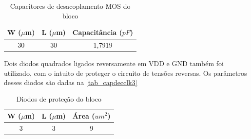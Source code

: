\begin{table}[htbp]
\caption{Capacitores de desacoplamento MOS do bloco \NomeBloco}
\label{tab_capdecclk2}
\centering
\begin{tabular}{ccc}
\toprule
W ($\mu$m)  & L ($\mu$m) & Capacit\^ancia ($pF$)\\
\midrule \midrule
30 & 30 & 1,7919\\
\bottomrule
\end{tabular}
\end{table}

Dois diodos quadrados ligados reversamente em VDD e GND tamb\'em foi utilizado, com o intuito de proteger o circuito de tens\~oes reversas. Os par\^ametros desses diodos s\~ao dadas na \autoref{tab_capdecclk3}

\begin{table}[htbp]
\caption{Diodos de prote{\c c}\~ao do bloco \NomeBloco}
\label{tab_capdecclk3}
\centering
\begin{tabular}{ccc}
\toprule
W ($\mu$m)  & L ($\mu$m) & \'Area ($um^2$)\\
\midrule \midrule
3 & 3 & 9\\
\bottomrule
\end{tabular}
\end{table}
\clearpage